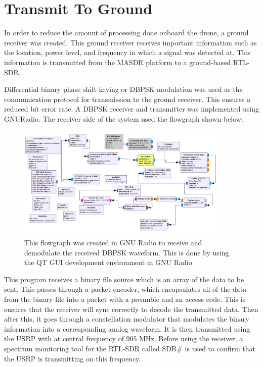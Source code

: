
\section{Transmit To Ground}

In order to reduce the amount of processing done onboard the drone, a ground receiver was created.  This ground receiver receives important information such as the location, power level, and frequency in which a signal was detected at.  This information is transmitted from the MASDR platform to a ground-based RTL-SDR.  

Differential binary phase shift keying or DBPSK modulation was used as the communication protocol for transmission to the ground receiver. This ensures a reduced bit error rate. A DBPSK receiver and transmitter was implemented using GNURadio. The receiver side of the system used the flowgraph shown below:

\begin{figure}[h]
  \centering
  \includegraphics[width=0.90\textwidth]{img/rxflow.PNG}
  \caption{This flowgraph was created in GNU Radio to receive and demodulate the received DBPSK waveform. This is done by using the QT GUI development environment in GNU Radio}
  \label{fig:rxflow}
\end{figure}

This program receives a binary file source which is an array of the data to be sent. This passes through a packet encoder, which encapsulates all of the data from the binary file into a packet with a preamble and an access code.  This is ensures that the receiver will sync correctly to decode the transmitted data.  Then after this, it goes through a constellation modulator that modulates the binary information into a corresponding analog waveform. It is then transmitted using the USRP with at central frequency of 905 MHz.  Before using the receiver, a spectrum monitoring tool for the RTL-SDR called SDR\# is used to confirm that the USRP is transmitting on this frequency.

